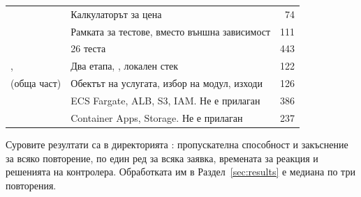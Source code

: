 \begin{table}[H]
\begin{tabular}{@{}L{6.2cm}L{6.4cm}r@{}}
 & Калкулаторът за цена & 74 \\
 & Рамката за тестове, вместо външна зависимост & 111 \\
 & 26 теста & 443 \\
,  & Два етапа, , локален стек & 122 \\
 (обща част) & Обектът на услугата, избор на модул, изходи & 126 \\
 & ECS Fargate, ALB, S3, IAM. Не е прилаган & 386 \\
 & Container Apps, Storage. Не е прилаган & 237 \\
\bottomrule
\end{tabular}
\end{table}

Суровите резултати са в директорията : пропускателна способност и закъснение за
всяко повторение, по един ред за всяка заявка, времената за реакция и решенията на контролера.
Обработката им в Раздел~\ref{sec:results} е медиана по три повторения.
